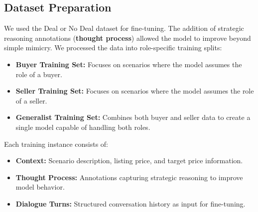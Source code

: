 \documentclass[11pt]{article}
\begin{document}
\subsection{Dataset Preparation}
We used the Deal or No Deal dataset for fine-tuning. The addition of strategic reasoning annotations (\textbf{thought process}) allowed the model to improve beyond simple mimicry. We processed the data into role-specific training splits:
\begin{itemize}
    \item \textbf{Buyer Training Set:} Focuses on scenarios where the model assumes the role of a buyer.
    \item \textbf{Seller Training Set:} Focuses on scenarios where the model assumes the role of a seller.
    \item \textbf{Generalist Training Set:} Combines both buyer and seller data to create a single model capable of handling both roles.
\end{itemize}
Each training instance consists of:
\begin{itemize}
    \item \textbf{Context:} Scenario description, listing price, and target price information.
    \item \textbf{Thought Process:} Annotations capturing strategic reasoning to improve model behavior.
    \item \textbf{Dialogue Turns:} Structured conversation history as input for fine-tuning.
\end{itemize}
\end{document}
